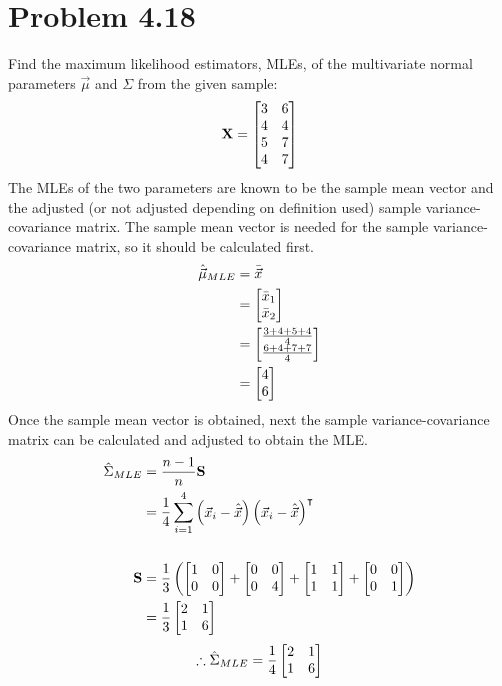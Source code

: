 \section*{Problem 4.18}
Find the maximum likelihood estimators, MLEs, of the multivariate normal parameters $\vec{\mu}$ and $\Sigma$ from the given sample: $$\mf{X} = \m{3 & 6 \\ 4 & 4 \\ 5 & 7 \\ 4 & 7}$$ The MLEs of the two parameters are known to be the sample mean vector and the adjusted (or not adjusted depending on definition used) sample variance-covariance matrix. The sample mean vector is needed for the sample variance-covariance matrix, so it should be calculated first.
\begin{align*}
	\hat{\vec{\mu}}_{MLE} &= \bar{\vec{x}} \\
	&= \m{\bar{x}_1 \\ \bar{x}_2} \\
	&= \m{\frac{3 + 4 + 5 + 4}{4} \\ \frac{6 + 4 + 7 + 7}{4}} \\
	&= \m{4 \\ 6}
\end{align*}
Once the sample mean vector is obtained, next the sample variance-covariance matrix can be calculated and adjusted to obtain the MLE.
\begin{align*}
	\hat{\Sigma}_{MLE} &= \frac{n-1}{n} \mf{S} \\
	&=\frac{1}{4} \sum_{i = 1}^{4}\p{\vec{x}_i - \hat{\vec{x}}}\p{\vec{x}_i - \hat{\vec{x}}}^{\T} \\
	\\
	\mf{S} &= \frac{1}{3}\p{\m{1 & 0 \\ 0 & 0} + \m{0 & 0 \\ 0 & 4} + \m{1 & 1 \\ 1 & 1} + \m{0 & 0 \\ 0 & 1}} \\
	&= \frac{1}{3} \m{2 & 1 \\ 1 & 6} \\
\end{align*}
$$\therefore \hat{\Sigma}_{MLE} = \frac{1}{4} \m{2 & 1 \\ 1 & 6}$$

\newpage
